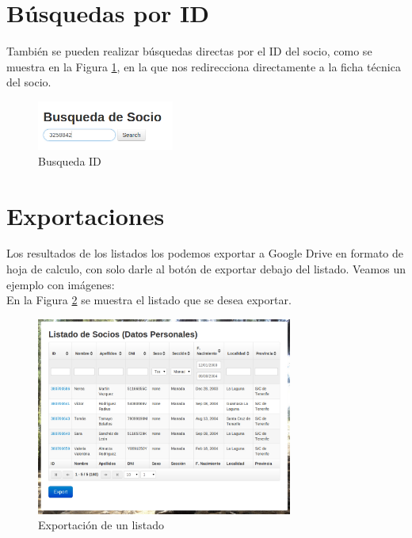 \section{Búsquedas por ID}
\label{3:sec5}

También se pueden realizar búsquedas directas por el ID del socio, como se muestra en la Figura \ref{fig:busqueda_id}, en la que nos redirecciona directamente  a la ficha técnica del socio.\\

\begin{figure}[H]
\begin{center}
\includegraphics[width=0.40\textwidth]{images/busqueda_id.jpg}
\caption{Busqueda ID}
\label{fig:busqueda_id}
\end{center}
\end{figure}

\section{Exportaciones}
\label{3:sec6}

Los resultados de los listados los podemos exportar a Google Drive en formato de hoja de calculo, con solo darle al botón de exportar debajo del listado. Veamos un ejemplo con imágenes:\\

En la Figura \ref{fig:list_export} se muestra el listado que se desea exportar.
\begin{figure}[H]
\begin{center}
\includegraphics[width=0.75\textwidth]{images/listado_export.jpg}
\caption{Exportación de un listado}
\label{fig:list_export}
\end{center}
\end{figure}


